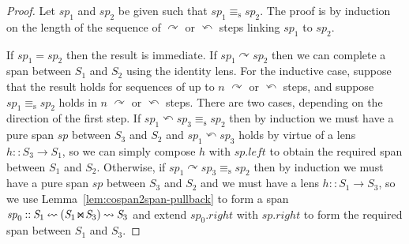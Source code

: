 \documentclass[runningheads]{llncs}
\newcommand{\Conid}[1]{\mathit{#1}}
\newcommand{\Varid}[1]{\mathit{#1}}
\begin{document}
\begin{proof}
  Let \ensuremath{\Varid{sp}_{\mathrm{1}}} and \ensuremath{\Varid{sp}_{\mathrm{2}}} be given such that \ensuremath{\Varid{sp}_{\mathrm{1}}\equiv_{\mathrm{s}} \Varid{sp}_{\mathrm{2}}}.  The
  proof is by induction on the length of the sequence of
  \ensuremath{\curvearrowright } or \ensuremath{\curvearrowleft } steps linking \ensuremath{\Varid{sp}_{\mathrm{1}}} to \ensuremath{\Varid{sp}_{\mathrm{2}}}.

  If \ensuremath{\Varid{sp}_{\mathrm{1}}\mathrel{=}\Varid{sp}_{\mathrm{2}}} then the result is immediate. If \ensuremath{\Varid{sp}_{\mathrm{1}}\curvearrowright \Varid{sp}_{\mathrm{2}}} then we can complete a span between \ensuremath{\Conid{S}_{1}} and \ensuremath{\Conid{S}_{2}} using
  the identity lens.  For the inductive case, suppose that the result
  holds for sequences of up to $n$ \ensuremath{\curvearrowright } or \ensuremath{\curvearrowleft } steps, and suppose
  \ensuremath{\Varid{sp}_{\mathrm{1}}\equiv_{\mathrm{s}} \Varid{sp}_{\mathrm{2}}} holds in $n$ 
\ensuremath{\curvearrowright } or \ensuremath{\curvearrowleft } steps.  There are two cases, depending on
the direction of the first step.  If \ensuremath{\Varid{sp}_{\mathrm{1}}\curvearrowleft \Varid{sp}_{\mathrm{3}}\equiv_{\mathrm{s}} \Varid{sp}_{\mathrm{2}}} then by induction we
  must have a pure span \ensuremath{\Varid{sp}} between \ensuremath{\Conid{S}_{3}} and \ensuremath{\Conid{S}_{2}} and \ensuremath{\Varid{sp}_{\mathrm{1}}\curvearrowleft \Varid{sp}_{\mathrm{3}}} holds by virtue of a lens \ensuremath{\Varid{h}\mathbin{::}\Conid{S}_{3}\to \Conid{S}_{1}}, so we
  can simply compose \ensuremath{\Varid{h}} with \ensuremath{\Varid{sp}\mathord{.}\Varid{left}} to obtain the required span
  between \ensuremath{\Conid{S}_{1}} and \ensuremath{\Conid{S}_{2}}.  Otherwise, if \ensuremath{\Varid{sp}_{\mathrm{1}}\curvearrowright \Varid{sp}_{\mathrm{3}}\equiv_{\mathrm{s}} \Varid{sp}_{\mathrm{2}}} then by induction we
  must have a pure span \ensuremath{\Varid{sp}} between \ensuremath{\Conid{S}_{3}} and \ensuremath{\Conid{S}_{2}} and we must have a lens \ensuremath{\Varid{h}\mathbin{::}\Conid{S}_{1}\to \Conid{S}_{3}}, so we use Lemma~\ref{lem:cospan2span-pullback} to form a span
  \ensuremath{\Varid{sp}_{\mathrm{0}}\mathbin{::}\Conid{S}_{1}\mathbin{{\reflectbox{$\rightsquigarrow$}}}(\Conid{S}_{1}\mathbin{\!\Join\!}\Conid{S}_{3})\mathbin{{\rightsquigarrow}}\Conid{S}_{3}} and extend \ensuremath{\Varid{sp}_{\mathrm{0}}\mathord{.}\Varid{right}} with
  \ensuremath{\Varid{sp}\mathord{.}\Varid{right}} to form the required span between \ensuremath{\Conid{S}_{1}} and \ensuremath{\Conid{S}_{3}}.
\end{proof}
\end{document}
